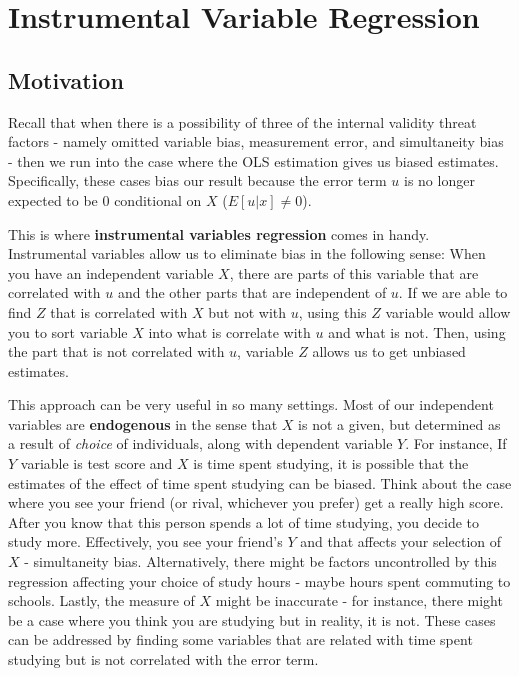 
\chapter{Instrumental Variable Regression}
\section{Motivation}
Recall that when there is a possibility of three of the internal validity threat factors - namely omitted variable bias, measurement error, and simultaneity bias - then we run into the case where the OLS estimation gives us biased estimates. Specifically, these cases bias our result because the error term $u$ is no longer expected to be 0 conditional on $X$ ($E[u|x]\neq 0$). \par\medskip

This is where \textbf{instrumental variables regression} comes in handy. Instrumental variables allow us to eliminate bias in the following sense: When you have an independent variable $X$, there are parts of this variable that are correlated with $u$ and the other parts that are independent of $u$. If we are able to find $Z$ that is correlated with $X$ but not with $u$, using this $Z$ variable would allow you to sort variable $X$ into what is correlate with $u$ and what is not. Then, using the part that is not correlated with $u$, variable $Z$ allows us to get unbiased estimates. \par\medskip

This approach can be very useful in so many settings. Most of our independent variables are \textbf{endogenous} in the sense that $X$ is not a given, but determined as a result of \textit{choice} of individuals, along with dependent variable $Y$. For instance, If $Y$ variable is test score and $X$ is time spent studying, it is possible that the estimates of the effect of time spent studying can be biased. Think about the case where you see your friend (or rival, whichever you prefer) get a really high score. After you know that this person spends a lot of time studying, you decide to study more. Effectively, you see your friend's $Y$ and that affects your selection of $X$ - simultaneity bias. Alternatively, there might be factors uncontrolled by this regression affecting your choice of study hours  - maybe hours spent commuting to schools. Lastly, the measure of $X$ might be inaccurate - for instance, there might be a case where you think you are studying but in reality, it is not. These cases can be addressed by finding some variables that are related with time spent studying but is not correlated with the error term. 

